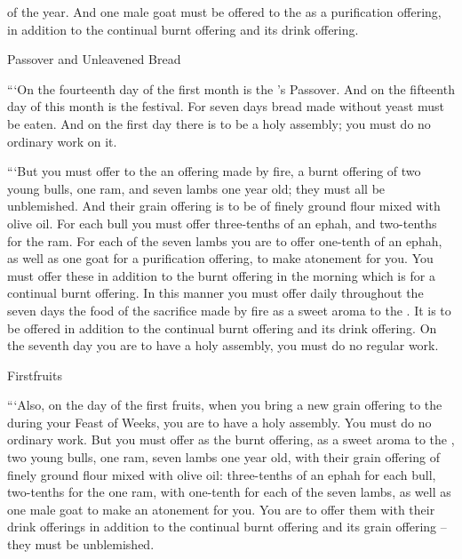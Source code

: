 {of the year.
And one male
goat
must be offered to the
{}
as a purification
offering, in addition to the continual
burnt offering
and its drink offering.
\par }{\SH Passover and Unleavened Bread
\par }{\PP {}“‘On the fourteenth
day
of the first
month
is the
{}’s
Passover.
And on the fifteenth
day
of this
month
is the festival.
For seven
days
bread made without yeast
must be eaten.
And on
the first
day
there is to be a holy
assembly;
you must do
no
ordinary
work on it.
\par }{\PP {}“‘But you must offer
to the
{}
an offering made
by fire,
a burnt offering
of two
young
bulls,
one
ram,
and seven
lambs
one year
old; they must all be unblemished.
And their grain offering
is to be of finely ground flour
mixed
with olive oil.
For each bull
you must offer
three-tenths of an ephah,
and two-tenths
for the ram.
For each
of the seven
lambs
you are to offer
one-tenth of an ephah,
as well as one goat
for a purification
offering, to make atonement for you.
You must offer
these
in addition
to the burnt offering
in the morning
which
is for a continual
burnt offering.
In this
manner you must offer
daily
throughout the seven
days
the food
of the sacrifice made by fire
as a sweet
aroma
to the
{}. It is to be offered
in addition to the continual
burnt offering
and its drink offering.
On
the seventh
day
you are to have a holy
assembly,
you must do
no
regular
work.
\par }{\SH Firstfruits
\par }{\PP {}“‘Also, on the day
of the first fruits,
when you bring
a new
grain offering
to the
{}
during your Feast of Weeks,
you are to have a holy
assembly.
You must do
no
ordinary
work.
But you must offer
as the burnt offering,
as a sweet
aroma
to the
{},
two
young
bulls,
one
ram,
seven
lambs
one year old,
with their grain offering
of finely ground flour
mixed
with olive oil: three-tenths of an ephah
for each
bull,
two-tenths
for the one
ram,
with one-tenth
for each
of the seven
lambs,
as well as one male
goat
to make an
atonement for you.
You are to offer
them with their drink offerings
in addition
to the continual
burnt offering
and its grain offering
– they must be
unblemished.


}
